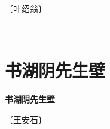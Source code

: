 \documentclass[12pt,UTF-8,openany,fontset=none]{ctexbook}
\begin{document}
\begin{center}
    \vspace{10pt}
    
    \begin{large}
        
        〔叶绍翁〕
        
    \end{large}
    
    \vspace{8pt}
    
    \begin{huge}
        
        \phantom{。}

        \phantom{。}
        
        \phantom{。}~~

        \phantom{。}
        
    \end{huge}
    
\end{center}

\vspace{8pt}
\clearpage


\section{书湖阴先生壁}



\begin{center}
    {\bfseries 书湖阴先生壁}
\end{center}

\begin{center}
    \vspace{10pt}
    
    \begin{large}
        
        〔王安石〕
        
    \end{large}
    
    \vspace{8pt}
    
    \begin{huge}
        
        \phantom{。}

        \phantom{。}
        
        \phantom{。}

        \phantom{。}
        
    \end{huge}
    
\end{center}
\end{document}
